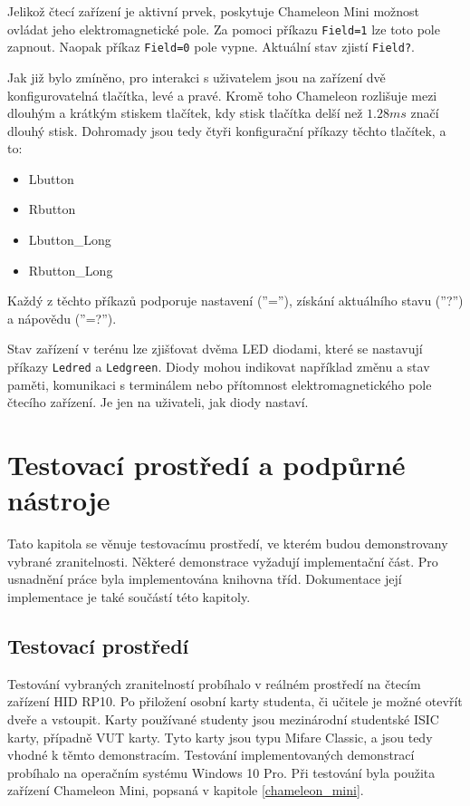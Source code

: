 Jelikož čtecí zařízení je aktivní prvek, poskytuje Chameleon Mini možnost ovládat jeho elektromagnetické pole. Za pomoci příkazu \verb|Field=1| lze toto pole zapnout. Naopak příkaz \verb|Field=0| pole vypne. Aktuální stav zjistí \verb|Field?|.\par
Jak již bylo zmíněno, pro interakci s uživatelem jsou na zařízení dvě konfigurovatelná tlačítka, levé a pravé. Kromě toho Chameleon rozlišuje mezi dlouhým a krátkým stiskem tlačítek, kdy stisk tlačítka delší než $1.28ms$ značí dlouhý stisk. Dohromady jsou tedy čtyři konfigurační příkazy těchto tlačítek, a to:
\begin{itemize}
\item Lbutton
\item Rbutton
\item {Lbutton\_Long}
\item {Rbutton\_Long}
\end{itemize}
Každý z těchto příkazů podporuje nastavení (''=''), získání aktuálního stavu (''?'') a nápovědu (''=?''). \par
Stav zařízení v terénu lze zjišťovat dvěma LED diodami, které se nastavují příkazy \verb|Ledred| a \verb|Ledgreen|. Diody mohou indikovat například změnu a stav paměti, komunikaci s terminálem nebo přítomnost elektromagnetického pole čtecího zařízení. Je jen na uživateli, jak diody nastaví.\cite{ChameleonDocs}

    
    \chapter{Testovací prostředí a podpůrné nástroje}
Tato kapitola se věnuje testovacímu prostředí, ve kterém budou demonstrovany vybrané zranitelnosti. Některé demonstrace vyžadují implementační část. Pro usnadnění práce byla implementována knihovna tříd. Dokumentace její implementace je také součástí této kapitoly.

\section{Testovací prostředí}
Testování vybraných zranitelností probíhalo v reálném prostředí na čtecím zařízení HID RP10\footnotemark. Po přiložení osobní karty studenta, či učitele je možné otevřít dveře a vstoupit. Karty používané studenty jsou mezinárodní studentské ISIC karty, případně VUT karty. Tyto karty jsou typu Mifare Classic, a jsou tedy vhodné k těmto demonstracím. Testování implementovaných demonstrací probíhalo na operačním systému Windows 10 Pro. Při testování byla použita zařízení Chameleon Mini, popsaná v kapitole \ref{chameleon_mini}.\par
{}


